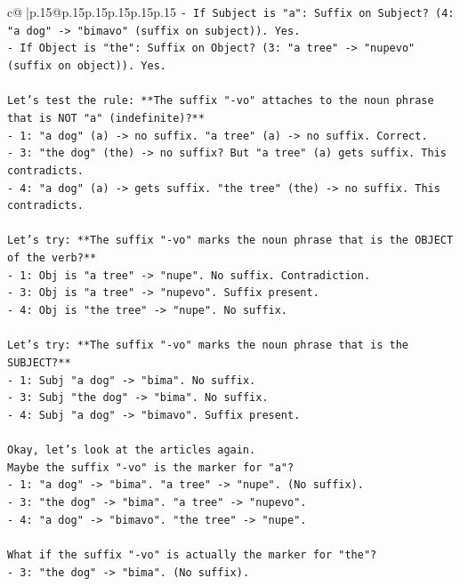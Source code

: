 \documentclass{article}
\begin{document}
{\begin{supertabular}{c@{$\;$}|p{.15\linewidth}@{}p{.15\linewidth}p{.15\linewidth}p{.15\linewidth}p{.15\linewidth}p{.15\linewidth}}
{{{\texttt{{-} If Subject is "a": Suffix on Subject? (4: "a dog" {-}> "bimavo" (suffix on subject)). Yes.} \\
\texttt{{-} If Object is "the": Suffix on Object? (3: "a tree" {-}> "nupevo" (suffix on object)). Yes.} \\
\\ 
\texttt{Let's test the rule: **The suffix "{-}vo" attaches to the noun phrase that is NOT "a" (indefinite)?**} \\
\texttt{{-} 1: "a dog" (a) {-}> no suffix. "a tree" (a) {-}> no suffix. Correct.} \\
\texttt{{-} 3: "the dog" (the) {-}> no suffix? But "a tree" (a) gets suffix. This contradicts.} \\
\texttt{{-} 4: "a dog" (a) {-}> gets suffix. "the tree" (the) {-}> no suffix. This contradicts.} \\
\\ 
\texttt{Let's try: **The suffix "{-}vo" marks the noun phrase that is the OBJECT of the verb?**} \\
\texttt{{-} 1: Obj is "a tree" {-}> "nupe". No suffix. Contradiction.} \\
\texttt{{-} 3: Obj is "a tree" {-}> "nupevo". Suffix present.} \\
\texttt{{-} 4: Obj is "the tree" {-}> "nupe". No suffix.} \\
\\ 
\texttt{Let's try: **The suffix "{-}vo" marks the noun phrase that is the SUBJECT?**} \\
\texttt{{-} 1: Subj "a dog" {-}> "bima". No suffix.} \\
\texttt{{-} 3: Subj "the dog" {-}> "bima". No suffix.} \\
\texttt{{-} 4: Subj "a dog" {-}> "bimavo". Suffix present.} \\
\\ 
\texttt{Okay, let's look at the articles again.} \\
\texttt{Maybe the suffix "{-}vo" is the marker for "a"?} \\
\texttt{{-} 1: "a dog" {-}> "bima". "a tree" {-}> "nupe". (No suffix).} \\
\texttt{{-} 3: "the dog" {-}> "bima". "a tree" {-}> "nupevo".} \\
\texttt{{-} 4: "a dog" {-}> "bimavo". "the tree" {-}> "nupe".} \\
\\ 
\texttt{What if the suffix "{-}vo" is actually the marker for "the"?} \\
\texttt{{-} 3: "the dog" {-}> "bima". (No suffix).} \\
}}}
\end{supertabular}}
\end{document}
